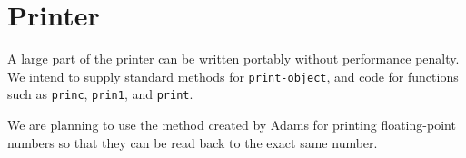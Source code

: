 \chapter{Printer}

A large part of the printer can be written portably without
performance penalty.  We intend to supply standard methods for
\texttt{print-object}, and code for functions such as \texttt{princ},
\texttt{prin1}, and \texttt{print}. 

We are planning to use the method created by Adams
\cite{Adams:2018:RFF:3296979.3192369} for printing floating-point
numbers so that they can be read back to the exact same number.
